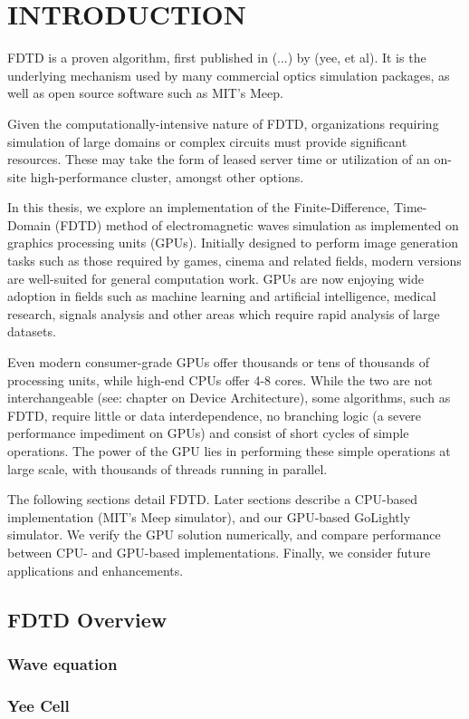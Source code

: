 \chapter{INTRODUCTION} \label{ch:introduction}

FDTD is a proven algorithm, first published in (...) by (yee, et al). It is the underlying mechanism used by many commercial optics simulation packages, as well as open source software such as MIT's Meep. 

Given the computationally-intensive nature of FDTD, organizations requiring simulation of large domains or complex circuits must provide significant resources. These may take the form of leased server time or utilization of an on-site high-performance cluster, amongst other options.

In this thesis, we explore an implementation of the Finite-Difference, Time-Domain (FDTD) method of electromagnetic waves simulation as implemented on graphics processing units (GPUs). Initially designed to perform image generation tasks such as those required by games, cinema and related fields, modern versions are well-suited for general computation work. GPUs are now enjoying wide adoption in fields such as machine learning and artificial intelligence, medical research, signals analysis and other areas which require rapid analysis of large datasets.

Even modern consumer-grade GPUs offer thousands or tens of thousands of processing units, while high-end CPUs offer 4-8 cores. While the two are not interchangeable (see: chapter on Device Architecture), some algorithms, such as FDTD, require little or data interdependence, no branching logic (a severe performance impediment on GPUs) and consist of short cycles of simple operations. The power of the GPU lies in performing these simple operations at large scale, with thousands of threads running in parallel. 

The following sections detail FDTD. Later sections describe a CPU-based implementation (MIT's  Meep simulator), and our GPU-based GoLightly simulator. We verify the GPU solution numerically, and compare performance between CPU- and GPU-based implementations. Finally, we consider future applications and enhancements. 


\section{FDTD Overview}



\subsection{Wave equation}

\subsection{Yee Cell}


